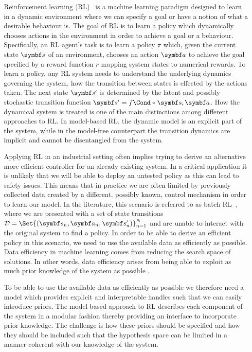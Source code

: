 Reinforcement learning (RL)~\parencite{sutton_reinforcement_2018} is a machine learning paradigm designed to learn in a dynamic environment where we can specify a goal or have a notion of what a desirable behaviour is.
The goal of RL is to learn a policy which dynamically chooses actions in the environment in order to achieve a goal or a behaviour.
Specifically, an RL agent's task is to learn a policy $\pi$ which, given the current state $\mat{s}$ of an environment, chooses an action $\mat{a}$ to achieve the goal specified by a reward function $r$ mapping system states to numerical rewards.
To learn a policy, any RL system needs to understand the underlying dynamics governing the system, how the transition between states is effected by the actions taken.
The next state $\mat{s}^\prime$ is determined by the latent and possibly stochastic transition function $\mat{s}^\prime = \Fun*{f}{\mat{s}, \mat{a}}$.
How the dynamical system is treated is one of the main distinctions among different approaches to RL.
In model-based RL, the dynamic model is an explicit part of the system, while in the model-free counterpart the transition dynamics are implicit and cannot be disentangled from the system.

Applying RL in an industrial setting often implies trying to derive an alternative more efficient controller for an already existing system.
In a critical application it is unlikely that we will be able to deploy an untested policy as this can lead to safety issues.
This means that in practice we are often limited by previously collected data created by a different, possibly known, control mechanism in order to learn our model.
In the literature, this scenario is referred to as batch RL~\parencite{lange_batch_2012}, where we are presented with a set of state transitions $\Dc = \Set{(\mat{s}_n, \mat{a}_n, \mat{s}_n^\prime)}_{n=1}^N$ and are unable to interact with the original system to find a policy.
In order to be able to derive an efficient policy in this scenario, we need to use the available data as efficiently as possible.
Data efficiency in machine learning comes from reducing the search space of solutions.
In other words, data efficiency arises from being able to exploit as much prior knowledge of the system as possible \parencite{shalev-shwartz_understanding_2014}.

To be able to use the available data as efficiently as possible we therefore need a model which provides explicit and interpretable handles such that we can easily introduce priors.
The model-based approach to RL describes each component of the system in a modular fashion thereby providing an interface to incorporate prior knowledge.
The challenge is how these priors should be specified and how they should be included such that the hypothesis space can be limited in a manner coherent with our knowledge of the system.

